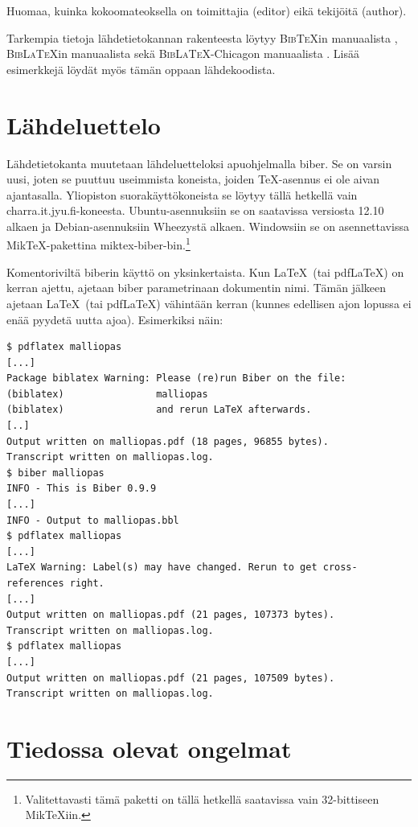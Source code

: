 \documentclass[utf8]{gradu3-tjt}
\begin{document}
Huomaa, kuinka kokoomateoksella on toimittajia (editor) eikä tekijöitä
(author).

Tarkempia tietoja lähdetietokannan rakenteesta löytyy
\textsc{Bib\TeX}in manuaalista \parencite{bibtexing},
\textsc{Bib\LaTeX}in manuaalista \parencite[luku~2]{biblatex-manual}
sekä \textsc{Bib\LaTeX}-Chicagon manuaalista
\parencite[luvut 5.1--5.2]{biblatex-chicago-manual}.  Lisää
esimerkkejä löydät myös tämän oppaan lähdekoodista.

\section{Lähdeluettelo}

Lähdetietokanta muutetaan lähdeluetteloksi apuohjelmalla {biber}.  Se
on varsin uusi, joten se puuttuu useimmista koneista, joiden
\TeX-asennus ei ole aivan ajantasalla.  Yliopiston suorakäyttökoneista
se löytyy tällä hetkellä vain charra.it.jyu.fi-koneesta.
Ubuntu-asennuksiin se on saatavissa versiosta 12.10 alkaen ja
Debian-asennuksiin Wheezystä alkaen.  Windowsiin se on asennettavissa
Mik\TeX-pakettina miktex-biber-bin.\footnote{Valitettavasti tämä
  paketti on tällä hetkellä saatavissa vain 32-bittiseen Mik\TeX iin.}

Komentoriviltä biberin käyttö on yksinkertaista.  Kun \LaTeX\ (tai
pdf\LaTeX) on kerran ajettu, ajetaan biber parametrinaan dokumentin
nimi.  Tämän jälkeen ajetaan \LaTeX\ (tai pdf\LaTeX) vähintään kerran
(kunnes edellisen ajon lopussa ei enää pyydetä uutta ajoa).
Esimerkiksi näin:

\begingroup\footnotesize
\begin{verbatim}
$ pdflatex malliopas
[...]
Package biblatex Warning: Please (re)run Biber on the file:
(biblatex)                malliopas
(biblatex)                and rerun LaTeX afterwards.
[..]
Output written on malliopas.pdf (18 pages, 96855 bytes).
Transcript written on malliopas.log.
$ biber malliopas
INFO - This is Biber 0.9.9
[...]
INFO - Output to malliopas.bbl
$ pdflatex malliopas
[...]
LaTeX Warning: Label(s) may have changed. Rerun to get cross-references right.
[...]
Output written on malliopas.pdf (21 pages, 107373 bytes).
Transcript written on malliopas.log.
$ pdflatex malliopas
[...]
Output written on malliopas.pdf (21 pages, 107509 bytes).
Transcript written on malliopas.log.
\end{verbatim}
\endgroup

\section{Tiedossa olevat ongelmat}
\end{document}
